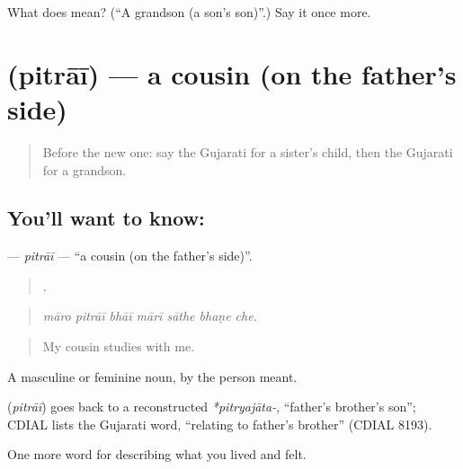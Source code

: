 \begin{tcolorbox}[breakable,colback=teal!4,colframe=teal!35!black,title={Before you move on}]
What does  mean? (\textquotedblleft{}A grandson (a son's son)\textquotedblright{}.) Say it once more.
\end{tcolorbox}
\section[\texorpdfstring{\gu{પિતરાઈ} (pitrāī)}{પિતરાઈ (pitrāī)}]{ (pitrāī) — a cousin (on the father's side)}

\label{lesson:GU-C492-pitrai}



\begin{quote}
Before the new one: say the Gujarati for a sister's child, then the Gujarati for a grandson.
\end{quote}

\subsection*{You'll want to know: }
\textbf{} — \emph{pitrāī} — \textquotedblleft{}a cousin (on the father's side)\textquotedblright{}.

\begin{quote}
      .
\end{quote}

\begin{quote}
\emph{māro pitrāī bhāī mārī sāthe bhaṇe che.}
\end{quote}

\begin{quote}
My cousin studies with me.
\end{quote}

A masculine or feminine noun, by the person meant.

\begin{cousinweb}
\textbf{} (\emph{pitrāī}) goes back to a reconstructed \emph{*pitryajāta-}, \textquotedblleft{}father's brother's son\textquotedblright{}; CDIAL lists the Gujarati word, \textquotedblleft{}relating to father's brother\textquotedblright{} (CDIAL 8193).
\end{cousinweb}

\begin{grammarlens}[title={What you've built}]
One more word for describing what you lived and felt.
\end{grammarlens}

